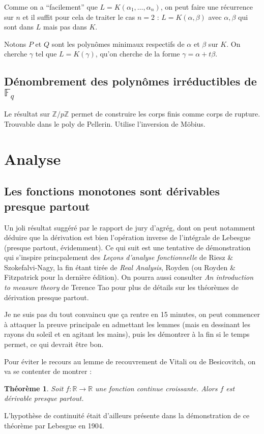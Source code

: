 \documentclass[a4paper, 11pt]{article}
\def\F{\mathbb{F}}
\def\Z{\mathbb{Z}}
\def\R{\mathbb{R}}
\newtheorem*{theorem}{Théorème}
\begin{document}
Comme on a \enquote{facilement} que $L = K(\alpha_1, \ldots, \alpha_n)$, on peut
faire une récurrence sur $n$ et il suffit pour cela de traiter le cas $n = 2$ :
$L = K(\alpha,\beta)$ avec $\alpha, \beta$ qui sont dans $L$ mais pas dans $K$.

Notons $P$ et $Q$ sont les polynômes minimaux respectifs de $\alpha$ et $\beta$
sur $K$. On cherche $\gamma$ tel que $L = K(\gamma)$, qu'on cherche de la forme
$\gamma = \alpha + t\beta$. 


\subsection{Dénombrement des polynômes irréductibles de $\F_q$}

Le résultat sur $\Z/p\Z$ permet de construire les corps finis comme corps de
rupture. Trouvable dans le poly de Pellerin. Utilise l'inversion de Möbius.

\section{Analyse}

\subsection{Les fonctions monotones sont dérivables presque partout}

Un joli résultat suggéré par le rapport de jury d'agrég, dont on peut notamment
déduire que la dérivation est bien l'opération inverse de l'intégrale de
Lebesgue (presque partout, évidemment). Ce qui suit est une tentative de
démonstration qui s'inspire princpalement des \emph{Leçons d'analyse
  fonctionnelle} de Riesz \& Szokefalvi-Nagy, la fin étant tirée de \emph{Real
  Analysis}, Royden (ou Royden \& Fitzpatrick pour la dernière édition). On
pourra aussi consulter \emph{An introduction to measure theory} de Terence Tao
pour plus de détails sur les théorèmes de dérivation presque partout.

Je ne suis pas du tout convaincu que ça rentre en 15 minutes, on peut commencer
à attaquer la preuve principale en admettant les lemmes (mais en dessinant les
rayons du soleil et en agitant les mains), puis les démontrer à la fin si le
temps permet, ce qui devrait être bon.

Pour éviter le recours au lemme de recouvrement de Vitali ou de Besicovitch, on
va se contenter de montrer :
\begin{theorem}
  Soit $f : \R \to \R$ une fonction \textnormal{continue} croissante. Alors $f$ est
  dérivable presque partout.
\end{theorem}
L'hypothèse de continuité était d'ailleurs présente dans la démonstration de ce
théorème par Lebesgue en 1904.
\end{document}

